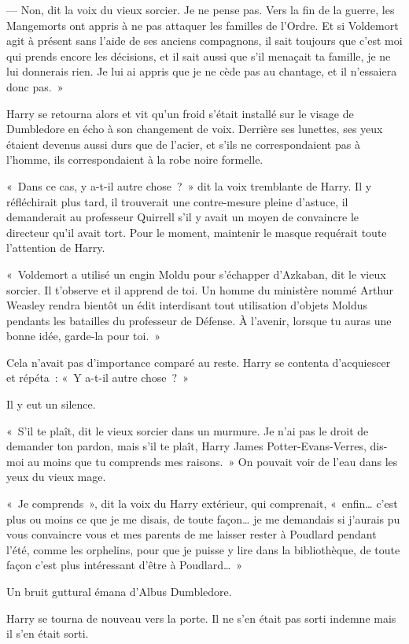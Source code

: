 --- Non, dit la voix du vieux sorcier.
Je ne pense pas.
Vers la fin de la guerre, les Mangemorts ont appris à ne pas attaquer les familles de l'Ordre.
Et si Voldemort agit à présent sans l'aide de ses anciens compagnons, il sait toujours que c'est moi qui prends encore les décisions, et il sait aussi que s'il menaçait ta famille, je ne lui donnerais rien.
Je lui ai appris que je ne cède pas au chantage, et il n'essaiera donc pas.~»

Harry se retourna alors et vit qu'un froid s'était installé sur le visage de Dumbledore en écho à son changement de voix.
Derrière ses lunettes, ses yeux étaient devenus aussi durs que de l'acier, et s'ils ne correspondaient pas à l'homme, ils correspondaient à la robe noire formelle.

«~Dans ce cas, y a-t-il autre chose~?~»
dit la voix tremblante de Harry.
Il y réfléchirait plus tard, il trouverait une contre-mesure pleine d'astuce, il demanderait au professeur Quirrell s'il y avait un moyen de convaincre le directeur qu'il avait tort.
Pour le moment, maintenir le masque requérait toute l'attention de Harry.

«~Voldemort a utilisé un engin Moldu pour s'échapper d'Azkaban, dit le vieux sorcier.
Il t'observe et il apprend de toi.
Un homme du ministère nommé Arthur Weasley rendra bientôt un édit interdisant tout utilisation d'objets Moldus pendants les batailles du professeur de Défense.
À l'avenir, lorsque tu auras une bonne idée, garde-la pour toi.~»

Cela n'avait pas d'importance comparé au reste.
Harry se contenta d'acquiescer et répéta~: «~Y a-t-il autre chose~?~»

Il y eut un silence.

«~S'il te plaît, dit le vieux sorcier dans un murmure.
Je n'ai pas le droit de demander ton pardon, mais s'il te plaît, Harry James Potter-Evans-Verres, dis-moi au moins que tu comprends mes raisons.~»
On pouvait voir de l'eau dans les yeux du vieux mage.

«~Je comprends~», dit la voix du Harry extérieur, qui comprenait, «~enfin… c'est plus ou moins ce que je me disais, de toute façon… je me demandais si j'aurais pu vous convaincre vous et mes parents de me laisser rester à Poudlard pendant l'été, comme les orphelins, pour que je puisse y lire dans la bibliothèque, de toute façon c'est plus intéressant d'être à Poudlard…~»

Un bruit guttural émana d'Albus Dumbledore.

Harry se tourna de nouveau vers la porte.
Il ne s'en était pas sorti indemne mais il s'en était sorti.

